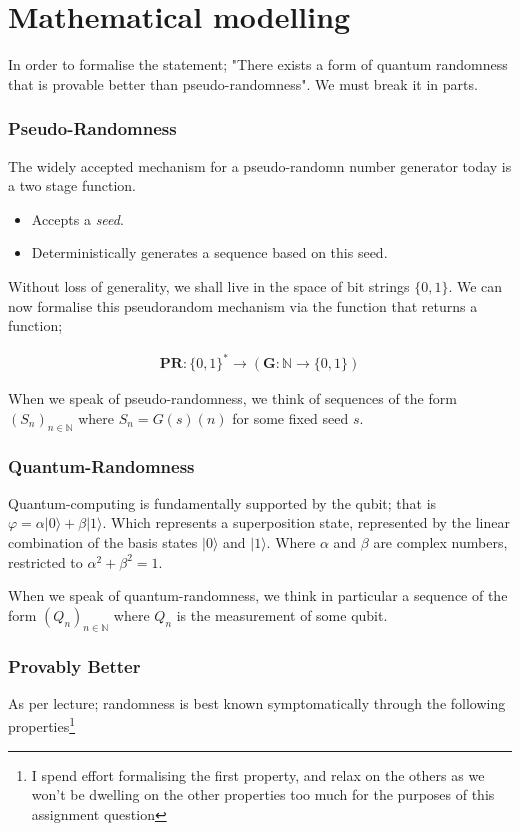 \documentclass{article}
\begin{document}
\pagebreak
\section*{Mathematical modelling}
In order to formalise the statement; "There exists a form of quantum randomness that is provable better than pseudo-randomness". We must break it in parts.

\subsubsection*{Pseudo-Randomness}
The widely accepted mechanism for a pseudo-randomn number generator today is a two stage function.

\begin{itemize}
	\item{Accepts a \emph{seed}.}
	\item{Deterministically generates a sequence based on this seed.}
\end{itemize}

Without loss of generality, we shall live in the space of bit strings $\{0, 1\}$. We can now formalise this pseudorandom mechanism via the function that returns a function;

\begin{align*}
	\bm{PR}: \{0,1\}^* \rightarrow (\bm{G}: \mathbb{N} \rightarrow \{0,1\})
\end{align*}

When we speak of pseudo-randomness, we think of sequences of the form $(S_n)_{n \in \mathbb{N}}$ where $S_n = G(s)(n)$ for some fixed seed $s$.

\subsubsection*{Quantum-Randomness}
Quantum-computing is fundamentally supported by the qubit; that is $\varphi = \alpha | 0\rangle + \beta | 1\rangle$. Which represents a superposition state, represented by the linear combination of the basis states $| 0\rangle$ and $| 1\rangle$. Where $\alpha$ and $\beta$ are complex numbers, restricted to $\alpha^2 + \beta^2 = 1$. 

When we speak of quantum-randomness, we think in particular a sequence of the form $(Q_n)_{n \in \mathbb{N}}$ where $Q_n$ is the measurement of some qubit.

\subsubsection*{Provably Better}
As per lecture; randomness is best known symptomatically through the following properties\footnote{I spend effort formalising the first property, and relax on the others as we won't be dwelling on the other properties too much for the purposes of this assignment question}
\end{document}

